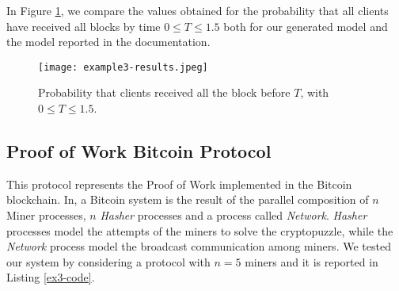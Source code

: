 In Figure \ref{ex2-res}, we compare the values obtained for the probability that all clients have received all blocks by time $0\leq T\leq 1.5$ both for our generated model and the model reported in the documentation.
\begin{figure}[h]
\centering
\texttt{[image: example3-results.jpeg]}	
\caption{Probability that clients received all the block before $T$, with $0\leq T \leq 1.5$.}
\label{ex2-res}
\end{figure}

\subsection{Proof of Work Bitcoin Protocol}
This protocol represents the Proof of Work implemented in the Bitcoin blockchain.
In\cite{DBLP:journals/concurrency/BistarelliNGLMV23}, a Bitcoin system is the result of the parallel composition of $n$ Miner processes, $n$  \emph{Hasher} processes and a process called \emph{Network}.
\emph{Hasher} processes model the attempts of the miners to solve the cryptopuzzle, while the \emph{Network} process model the broadcast communication among miners. 
We tested our system by considering a protocol with $n=5$ miners and it is reported in Listing \ref{ex3-code}.
